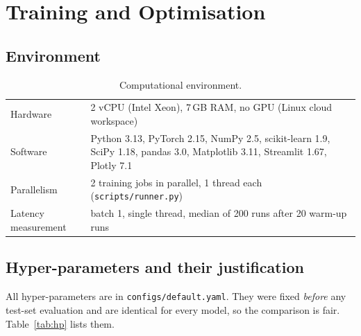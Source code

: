\chapter{Training and Optimisation}

\section{Environment}
\label{sec:env}
\begin{table}[h]
\centering
\caption{Computational environment.}
\label{tab:env}
\small
\begin{tabular}{L{4cm}L{10cm}}
\toprule
Hardware & 2 vCPU (Intel Xeon), 7\,GB RAM, no GPU (Linux cloud workspace) \\
Software & Python 3.13, PyTorch 2.15, NumPy 2.5, scikit-learn 1.9, SciPy 1.18, pandas 3.0, Matplotlib 3.11, Streamlit 1.67, Plotly 7.1 \\
Parallelism & 2 training jobs in parallel, 1 thread each (\texttt{scripts/runner.py}) \\
Latency measurement & batch 1, single thread, median of 200 runs after 20 warm-up runs \\
\bottomrule
\end{tabular}
\end{table}

\section{Hyper-parameters and their justification}
All hyper-parameters are in \texttt{configs/default.yaml}. They were fixed
\emph{before} any test-set evaluation and are identical for every model, so the
comparison is fair. Table~\ref{tab:hp} lists them.

